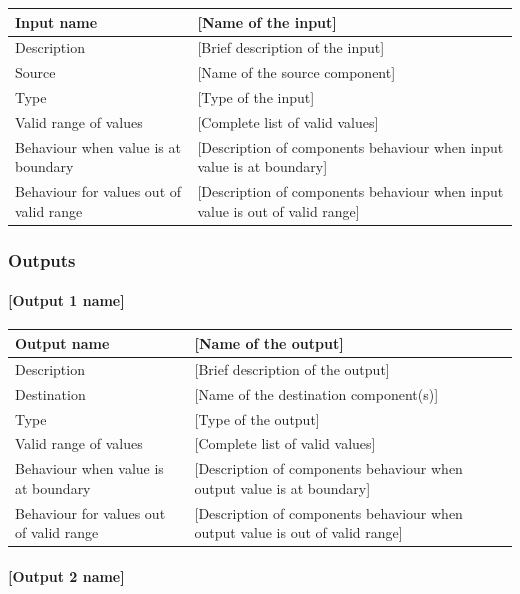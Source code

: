 \begin{longtable}{p{}p{}}
\toprule
Input name				& [Name of the input] \\
\midrule
Description				& [Brief description of the input] \\
\midrule
Source					& [Name of the source component] \\ 
\midrule
Type					& [Type of the input] \\
\midrule
Valid range of values	& [Complete list of valid values] \\
\midrule
Behaviour when value is at boundary	& [Description of components behaviour when input value is at boundary] \\
\midrule
Behaviour for values out of valid range	& [Description of components behaviour when input value is out of valid range] \\
\bottomrule
\end{longtable}


\subsubsection{Outputs}\label{s:Manage_Trackside_outputs}

\paragraph{[Output 1 name]}

\begin{longtable}{p{}p{}}
\toprule
Output name				& [Name of the output] \\
\midrule
Description				& [Brief description of the output] \\
\midrule
Destination				& [Name of the destination component(s)] \\ 
\midrule
Type					& [Type of the output] \\
\midrule
Valid range of values	& [Complete list of valid values] \\
\midrule
Behaviour when value is at boundary	& [Description of components behaviour when output value is at boundary] \\
\midrule
Behaviour for values out of valid range	& [Description of components behaviour when output value is out of valid range] \\
\bottomrule
\end{longtable}


\paragraph{[Output 2 name]}

